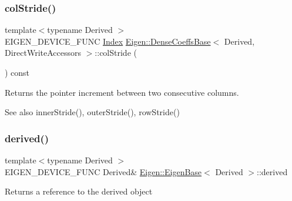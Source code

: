 \subsubsection{\texorpdfstring{colStride()}{colStride()}}
{\footnotesize\ttfamily template$<$typename Derived $>$ \\
E\+I\+G\+E\+N\+\_\+\+D\+E\+V\+I\+C\+E\+\_\+\+F\+U\+NC \mbox{\hyperlink{struct_eigen_1_1_eigen_base_a554f30542cc2316add4b1ea0a492ff02}{Index}} \mbox{\hyperlink{class_eigen_1_1_dense_coeffs_base}{Eigen\+::\+Dense\+Coeffs\+Base}}$<$ Derived, Direct\+Write\+Accessors $>$\+::col\+Stride (\begin{DoxyParamCaption}{ }\end{DoxyParamCaption}) const\hspace{0.3cm}{\ttfamily [inline]}}

\begin{DoxyReturn}{Returns}
the pointer increment between two consecutive columns.
\end{DoxyReturn}
\begin{DoxySeeAlso}{See also}
inner\+Stride(), outer\+Stride(), row\+Stride() 
\end{DoxySeeAlso}
\mbox{\label{class_eigen_1_1_dense_coeffs_base_3_01_derived_00_01_direct_write_accessors_01_4_a324b16961a11d2ecfd2d1b7dd7946545}} 
\subsubsection{\texorpdfstring{derived()}{derived()}\hspace{0.1cm}{\footnotesize\ttfamily [1/2]}}
{\footnotesize\ttfamily template$<$typename Derived $>$ \\
E\+I\+G\+E\+N\+\_\+\+D\+E\+V\+I\+C\+E\+\_\+\+F\+U\+NC Derived\& \mbox{\hyperlink{struct_eigen_1_1_eigen_base}{Eigen\+::\+Eigen\+Base}}$<$ Derived $>$\+::derived\hspace{0.3cm}{\ttfamily [inline]}}

\begin{DoxyReturn}{Returns}
a reference to the derived object 
\end{DoxyReturn}
\mbox{\label{class_eigen_1_1_dense_coeffs_base_3_01_derived_00_01_direct_write_accessors_01_4_ad0cbee5e2dfef3bbe9db5e6d5fe12cc0}} 
